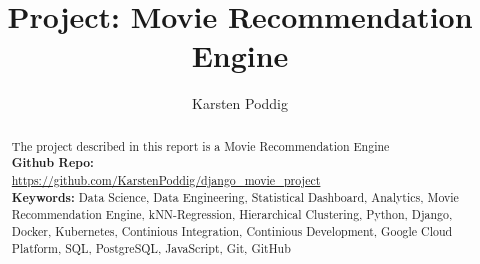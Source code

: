 \documentclass{article}
\title{Project: Movie Recommendation Engine}
\author{Karsten Poddig}
\begin{document}
\maketitle

\begin{abstract}
The project described in this report is a Movie Recommendation Engine\\[2ex]
\textbf{Github Repo:}\\
\url{https://github.com/KarstenPoddig/django_movie_project}\\[2ex]
\textbf{Keywords:} Data Science, Data Engineering, Statistical Dashboard, Analytics, Movie Recommendation Engine, kNN-Regression, Hierarchical Clustering,  Python, Django, Docker, Kubernetes, Continious Integration, Continious Development, Google Cloud Platform, SQL, PostgreSQL, JavaScript, Git, GitHub


\end{abstract}
\end{document}

